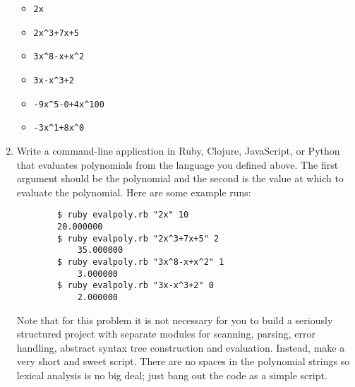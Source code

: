 \documentclass{article}
\begin{document}
\begin{enumerate}
        \begin{itemize}
            \item \begin{verbatim}2x\end{verbatim}
            \item \begin{verbatim}2x^3+7x+5\end{verbatim}
            \item \begin{verbatim}3x^8-x+x^2\end{verbatim}
            \item \begin{verbatim}3x-x^3+2\end{verbatim}
            \item \begin{verbatim}-9x^5-0+4x^100\end{verbatim}
            \item \begin{verbatim}-3x^1+8x^0\end{verbatim}
        \end{itemize}
    \pagebreak
    \item Write a command-line application in Ruby, Clojure, JavaScript, or Python that evaluates polynomials from the language you defined above. The first argument should be the polynomial and the second is the value at which to evaluate the polynomial. Here are some example runs:
    \begin{verbatim}
        $ ruby evalpoly.rb "2x" 10
        20.000000
        $ ruby evalpoly.rb "2x^3+7x+5" 2
            35.000000
        $ ruby evalpoly.rb "3x^8-x+x^2" 1
            3.000000
        $ ruby evalpoly.rb "3x-x^3+2" 0
            2.000000
    \end{verbatim}
    Note that for this problem it is not necessary for you to build a seriously structured project with separate modules for scanning, parsing, error handling, abstract syntax tree construction and evaluation. Instead, make a very short and sweet script. There are no spaces in the polynomial strings so lexical analysis is no big deal; just bang out the code as a simple script. \\
    \pagebreak
\end{enumerate}
\end{document}
